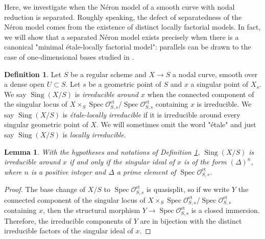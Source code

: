 \documentclass[a4paper,10pt,twoside]{article}
\newcommand{\ra}{\rightarrow}
\newcommand{\on}[1]{\operatorname{#1}}
\renewcommand{\O}{\mathcal{O}}
\DeclareMathOperator{\spec}{Spec}
\DeclareMathOperator{\sing}{Sing}
\newtheorem{lem}[thm]{Lemma}
\newtheorem{cor}[thm]{Corollary}
\theoremstyle{definition}
\newtheorem{defi}[thm]{Definition}
\theoremstyle{remark}
\renewcommand{\on}[1]{\operatorname{#1}}
\begin{document}
Here, we investigate when the Néron model of a smooth curve with nodal reduction is separated. Roughly speaking, the defect of separatedness of the N\'eron model comes from the existence of distinct locally factorial models. In fact, we will show that a separated N\'eron model exists precisely when there is a canonical "minimal \'etale-locally factorial model": parallels can be drawn to the case of one-dimensional bases studied in \cite{LiuTong}.

\begin{defi}\label{Purete d'une courbe nodal}
	Let $S$ be a regular scheme and $X\ra S$ a nodal curve, smooth over a dense open $U\subset S$. Let $s$ be a geometric point of $S$ and $x$ a singular point of $X_s$. We say $\sing(X/S)$ is \emph{irreducible around $x$} when the connected component of the singular locus of $X\times_S\spec\O_{S,s}^{\on{et}}/\spec\O_{S,s}^{\on{et}}$ containing $x$ is irreducible. We say $\sing(X/S)$ is \emph{étale-locally irreducible} if it is irreducible around every singular geometric point of $X$. We will sometimes omit the word "\'etale" and just say $\sing(X/S)$ is \emph{locally irreducible}.
\end{defi}	

\begin{lem}
	With the hypotheses and notations of Definition \ref{Purete d'une courbe nodal}, $\sing(X/S)$ is irreducible around $x$ if and only if the singular ideal of $x$ is of the form $(\Delta)^n$, where $n$ is a positive integer and $\Delta$ a prime element of $\spec\O_{S,s}^{\on{et}}$.
\end{lem}

\begin{proof}
The base change of $X/S$ to $\spec\O_{S,s}^{\on{et}}$ is quasisplit, so if we write $Y$ the connected component of the singular locus of $X\times_S\spec\O_{S,s}^{\on{et}}/\spec\O_{S,s}^{\on{et}}$ containing $x$, then the structural morphism $Y\ra \spec\O_{S,s}^{\on{et}}$ is a closed immersion. Therefore, the irreducible components of $Y$ are in bijection with the distinct irreducible factors of the singular ideal of $x$.
\end{proof}

\end{document}
